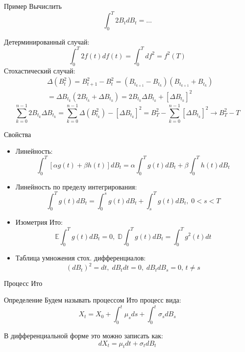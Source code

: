 \documentclass{beamer}
\begin{document}
\begin{frame}{Пример}
    Вычислить
    $$
        \int_0^T 2 B_t dB_t = \ldots
    $$
     
    Детерминированный случай:
    $$
        \int_0^T 2 f(t) df(t) = \int_0^T d f^2 = f^2(T)
    $$ 
    Стохастический случай:
    \begin{align*}
        &\Delta \left(B_t^2\right) = B_{t+1}^2 - B_t^2 = \left( B_{t_{k+1}}-B_{t_k} \right)
        \left( B_{t_{k+1}}+B_{t_k} \right)\\ 
        &= \Delta B_{t_k} \left( 2 B_{t_k} + \Delta B_{t_k}\right) = 2 B_{t_k} \Delta B_{t_k} + \left[\Delta B_{t_k}\right]^2
    \end{align*} 
    $$
        \sum_{k=0}^{n-1} 2 B_{t_k} \Delta B_{t_k} = 
        \sum_{k=0}^{n-1}\Delta \left(B_{t_k}^2\right) - \left[\Delta B_{t_k}\right]^2 = B_T^2 - \sum_{k=0}^{n-1} \left[\Delta B_{t_k}\right]^2 \to B_T^2 - T 
    $$
\end{frame}

\begin{frame}{Свойства}
    \begin{itemize}
        \item Линейность: $$\int_{0}^T \left[\alpha g(t) + \beta h(t)\right] dB_t = \alpha \int_0^T g(t) dB_t + \beta \int_0^T h(t) dB_t$$
        \item Линейность по пределу интегрирования:
        $$\int_0^T g(t) dB_t = \int_0^s g(t) dB_t + \int_s^T g(t) dB_t, \; 0 < s < T$$
        \item Изометрия Ито:
        $$
            \mathbb{E} \int_0^T g(t) dB_t = 0, \; \mathbb{D} \int_0^T g(t) dB_t = \int_0^T g^2(t) dt
        $$
        \item Таблица умножения стох. дифференциалов:
        $$
            (dB_t)^2 = dt,\; dB_t dt = 0, \; dB_t dB_s = 0, \, t\neq s 
        $$
    \end{itemize}
\end{frame}

\begin{frame}{Процесс Ито}
    \begin{block}{Определение}
        Будем называть процессом Ито процесс вида:
        $$
            X_t = X_0 + \int_0^t \mu_s ds + \int_0^t \sigma_s dB_s
        $$
    \end{block}
    В дифференциальной форме это можно записать как:
    $$
        dX_t = \mu_t dt + \sigma_t dB_t
    $$
\end{frame}
\end{document}
